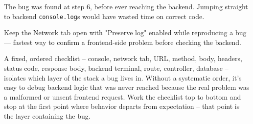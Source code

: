 \begin{warnbox}[WARNING]
The bug was found at step 6, before ever reaching the backend. Jumping
straight to backend \texttt{console.log}s would have wasted time on
correct code.
\end{warnbox}

\begin{tipbox}[TIP]
Keep the Network tab open with "Preserve log" enabled while reproducing a
bug --- fastest way to confirm a frontend-side problem before checking the
backend.
\end{tipbox}

\whatwhyhow
{A fixed, ordered checklist -- console, network tab, URL, method, body, headers, status code, response body, backend terminal, route, controller, database -- isolates which layer of the stack a bug lives in.}
{Without a systematic order, it's easy to debug backend logic that was never reached because the real problem was a malformed or unsent frontend request.}
{Work the checklist top to bottom and stop at the first point where behavior departs from expectation -- that point is the layer containing the bug.}
